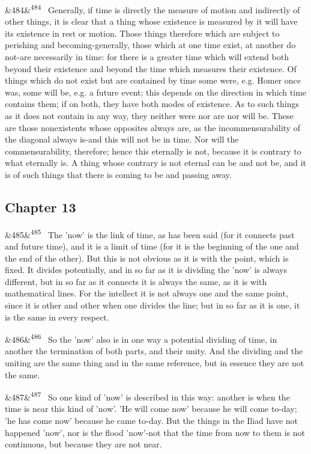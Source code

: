 \documentclass[12pt]{article}
\newcommand{\para}[1][]{\par\noindent\ifx&#1&\else\textsuperscript{\footnotesize #1}~\fi}
\begin{document}
\para[484] Generally, if time is directly the measure of motion and indirectly of other things, it is clear that a thing whose existence is measured by it will have its existence in rest or motion. Those things therefore which are subject to perishing and becoming-generally, those which at one time exist, at another do not-are necessarily in time: for there is a greater time which will extend both beyond their existence and beyond the time which measures their existence. Of things which do not exist but are contained by time some were, e.g. Homer once was, some will be, e.g. a future event; this depends on the direction in which time contains them; if on both, they have both modes of existence. As to such things as it does not contain in any way, they neither were nor are nor will be. These are those nonexistents whose opposites always are, as the incommensurability of the diagonal always is-and this will not be in time. Nor will the commensurability, therefore; hence this eternally is not, because it is contrary to what eternally is. A thing whose contrary is not eternal can be and not be, and it is of such things that there is coming to be and passing away.

\subsection*{Chapter 13}

\para[485] The 'now' is the link of time, as has been said (for it connects past and future time), and it is a limit of time (for it is the beginning of the one and the end of the other). But this is not obvious as it is with the point, which is fixed. It divides potentially, and in so far as it is dividing the 'now' is always different, but in so far as it connects it is always the same, as it is with mathematical lines. For the intellect it is not always one and the same point, since it is other and other when one divides the line; but in so far as it is one, it is the same in every respect.

\para[486] So the 'now' also is in one way a potential dividing of time, in another the termination of both parts, and their unity. And the dividing and the uniting are the same thing and in the same reference, but in essence they are not the same.

\para[487] So one kind of 'now' is described in this way: another is when the time is near this kind of 'now'. 'He will come now' because he will come to-day; 'he has come now' because he came to-day. But the things in the Iliad have not happened 'now', nor is the flood 'now'-not that the time from now to them is not continuous, but because they are not near.
\end{document}
